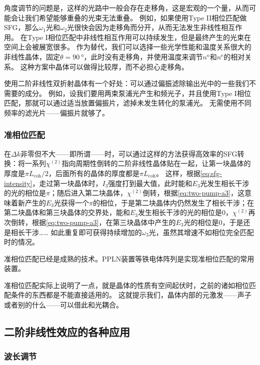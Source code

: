 角度调节的问题是，这样的光路中一般会存在走移角，这是宏观的一个量，从而可能会让我们希望能够重叠的光束无法重叠。
例如，如果使用Type II相位匹配做SFG，那么$\omega_1$光和$\omega_2$光很快会因为走移角而分开，从而无法发生非线性相互作用。
在Type I相位匹配中非线性相互作用可以持续发生，但是最终产生的光束在空间上会被展宽很多。
作为替代，我们可以选择一些光学性能和温度关系很大的非线性晶体，固定$\theta = \SI{90}{\degree}$，此时没有走移角，并使用温度来调节$n^\text{o}$和$n^\text{e}$的相对关系。
这种方案中晶体可以做得比较厚，而不必担心走移角。

使用二阶非线性双折射晶体有一个好处：可以通过偏振滤除输出光中的一些我们不需要的成分。
例如，设我们要用两束泵浦光产生和频光子，并且使用Type I相位匹配，那就可以通过适当放置偏振片，滤掉未发生转化的泵浦光。
无需使用不同频率的滤光片——偏振片就够了。

\subsubsection{准相位匹配}

在$\Delta k$非零但不大——即所谓——时，可以通过这样的方法获得高效率的SFG转换：将一系列$\chi^{(2)}$指向周期性倒转的二阶非线性晶体贴在一起，让第一块晶体的厚度是$\pi L_\text{coh} / 2$，后面所有的晶体的厚度都是$\pi L_\text{coh}$。
这样，根据\eqref{eq:sfg-intensity}，走过第一块晶体时，$I_3$强度打到最大值，此时能和$E_3$光发生相长干涉的光的相位是$\pi$；随后进入第二块晶体，$\chi^{(2)}$倒转，根据\eqref{eq:two-pump-a3}，这意味着新产生的$E_3$光获得一个$\pi$的相位，于是第二块晶体内仍然发生了相长干涉；在第二块晶体和第三块晶体的交界处，能和$E_3$发生相长干涉的光的相位是$0$，$\chi^{(2)}$再次倒转，根据\eqref{eq:two-pump-a3}，在第三块晶体中产生的$E_3$光的相位是$0$，于是还是相长干涉……
如此重复即可获得持续增加的$\omega_3$光，虽然其增速不如相位完全匹配时的情况。

准相位匹配已经是成熟的技术。PPLN装置等铁电体阵列是实现准相位匹配的常用装置。

准相位匹配实际上说明了一点，就是晶体的性质有空间起伏时，之前的诸如相位匹配条件的东西都是不能直接适用的。
这就提示我们，晶体内部的元激发——声子或者别的什么——可以借此和光耦合。

\subsection{二阶非线性效应的各种应用}

\subsubsection{波长调节}

